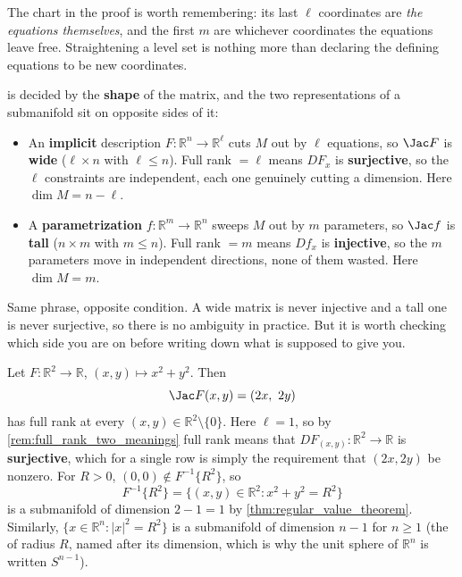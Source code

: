 The chart in the proof is worth remembering: its last $\ell$ coordinates are \emph{the equations
themselves}, and the first $m$ are whichever coordinates the equations leave free. Straightening
a level set is nothing more than declaring the defining equations to be new coordinates.

\begin{importantremark}
\label{rem:full_rank_two_meanings}
 is decided by the \textbf{shape} of the matrix, and the two representations of a
submanifold sit on opposite sides of it:
\begin{itemize}
  \item An \textbf{implicit} description $F : \mathbb{R}^n \to \mathbb{R}^\ell$ cuts $M$ out by
    $\ell$ equations, so $\Jac F$ is \textbf{wide} ($\ell \times n$ with $\ell \leq n$). Full
    rank $=\ell$ means $DF_x$ is \textbf{surjective}, so the $\ell$ constraints are independent,
    each one genuinely cutting a dimension. Here $\dim M = n - \ell$.
  \item A \textbf{parametrization} $f : \mathbb{R}^m \to \mathbb{R}^n$ sweeps $M$ out by $m$
    parameters, so $\Jac f$ is \textbf{tall} ($n \times m$ with $m \leq n$). Full rank $=m$
    means $Df_x$ is \textbf{injective}, so the $m$ parameters move in independent directions,
    none of them wasted. Here $\dim M = m$.
\end{itemize}
Same phrase, opposite condition. A wide matrix is never injective and a tall one is never
surjective, so there is no ambiguity in practice. But it is worth checking which side you are on
before writing down what  is supposed to give you.
\end{importantremark}

\begin{example}
Let $F : \mathbb{R}^2 \to \mathbb{R}$, $(x,y) \mapsto x^2+y^2$. Then
\[\Jac F(x,y) = (2x,\ 2y)\]
has full rank at every $(x,y) \in \mathbb{R}^2\setminus\{0\}$. Here $\ell = 1$, so by
\cref{rem:full_rank_two_meanings} full rank means that $DF_{(x,y)} : \mathbb{R}^2 \to \mathbb{R}$
is \textbf{surjective}, which for a single row is simply the requirement that $(2x,2y)$ be
nonzero. For $R>0$, $(0,0) \notin F^{-1}\{R^2\}$, so
\[F^{-1}\{R^2\} = \{(x,y) \in \mathbb{R}^2 : x^2+y^2=R^2\}\]
is a submanifold of dimension $2-1=1$ by \cref{thm:regular_value_theorem}. Similarly,
$\{x \in \mathbb{R}^n : |x|^2=R^2\}$ is a submanifold of dimension $n-1$ for $n \geq 1$ (the
 of radius $R$, named after its dimension, which is why the unit sphere
of $\mathbb{R}^n$ is written $S^{n-1}$).
\end{example}

